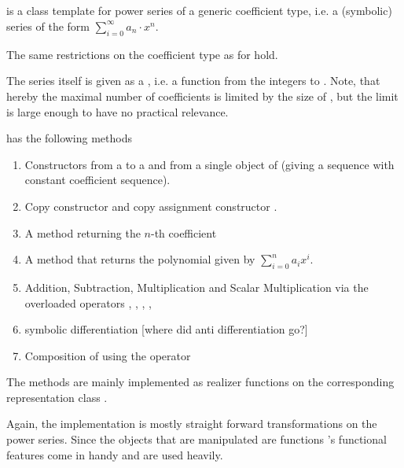 		\subsection{\powerseries}
			\textbf{} is a class template for power series of a generic coefficient type, 
			i.e. a (symbolic) series of the form $ \sum_{i=0}^\infty a_n \cdot x^n$.

			The same restrictions on the coefficient type as for \poly hold.
			
			The series itself is given as a , i.e. a function from the integers to . Note, that hereby the maximal number of coefficients is limited by the size of , 
			but the limit is large enough to have no practical relevance.   

			\powerseries has the following methods
			\begin{enumerate}
				\item Constructors from a  to a  and from a single object of  (giving a sequence with constant coefficient sequence).
				\item Copy constructor  and copy assignment constructor 
				.
				\item A method  returning the $n$-th coefficient
				\item A method  that returns the polynomial given by 
				$ \sum_{i=0}^n a_i x^i $.

				\item Addition, Subtraction, Multiplication and Scalar Multiplication via the overloaded operators \code{+}, \code{-}, \code{*}, \code{+=}, \code{*=}
				\item symbolic differentiation  [where did anti differentiation go?]
				\item Composition of \powerseries using the operator \code{()}
			\end{enumerate}
			The methods are mainly implemented as realizer functions on the corresponding representation class . 

			Again, the implementation is mostly straight forward transformations on the power series. 
			Since the objects that are manipulated are functions {\ccx}'s functional features come in handy and are used heavily. 		

